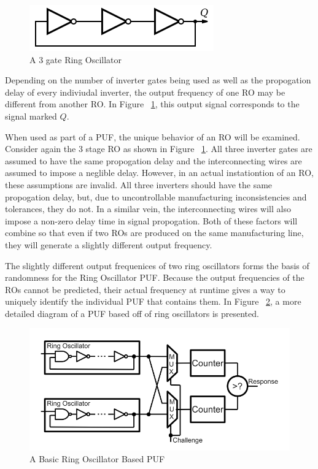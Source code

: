 \begin{figure}[h] %
\includegraphics[]{images/ro.png}
\caption{A 3 gate Ring Oscillator}
\label{fig:ro}
\end{figure}

Depending on the number of inverter gates being used
as well as the propogation delay of every indiviudal inverter, the output
frequency of one RO may be different from another RO. In Figure ~\ref{fig:ro},
this output signal corresponds to the signal marked $Q$.

When used as part of a PUF, the unique behavior of an RO will be examined.
Consider again the 3 stage RO as shown in Figure ~\ref{fig:ro}. All three
inverter gates are assumed to have the same propogation delay and the
interconnecting wires are assumed to impose a neglible delay. However, in
an actual instationtion of an RO, these assumptions are invalid. All three inverters
should have the same propogation delay, but, due to uncontrollable manufacturing
inconsistencies and tolerances, they do not. In a similar vein, the interconnecting
wires will also impose a non-zero delay time in signal propogation. Both of these
factors will combine so that even if two ROs are produced on the same 
manufacturing line, they will generate a slightly different output frequency.

The slightly different output frequenices of two ring oscillators forms the basis
of randomness for the Ring Oscillator PUF. Because the output frequencies of the
ROs cannot be predicted, their actual frequency at runtime gives a way to uniquely
identify the individual PUF that contains them. In Figure ~\ref{fig:ropuf}, a more
detailed diagram of a PUF based off of ring oscillators is presented.

\begin{figure}[h]
\includegraphics[width=500px]{images/ropuf.png}
\caption{A Basic Ring Oscillator Based PUF}
\label{fig:ropuf}
\end{figure}

